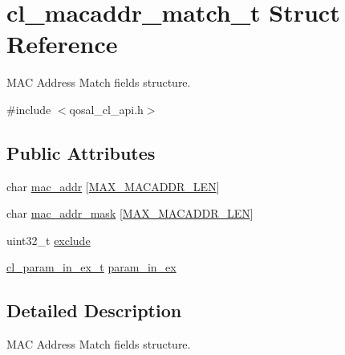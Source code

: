 \hypertarget{structcl__macaddr__match__t}{\section{cl\-\_\-macaddr\-\_\-match\-\_\-t Struct Reference}
\label{structcl__macaddr__match__t}
}


M\-A\-C Address Match fields structure.  




{\ttfamily \#include $<$qosal\-\_\-cl\-\_\-api.\-h$>$}

\subsection*{Public Attributes}
\begin{DoxyCompactItemize}
\item 
char \hyperlink{structcl__macaddr__match__t_a9ba77bbd538c732284e04b1ea1dc0a47}{mac\-\_\-addr} \mbox{[}\hyperlink{group__FAPI__QOS__CLASS_gaaee7f1d8ba9da4f019bf0068103e6672}{M\-A\-X\-\_\-\-M\-A\-C\-A\-D\-D\-R\-\_\-\-L\-E\-N}\mbox{]}
\item 
char \hyperlink{structcl__macaddr__match__t_aa661f14e7e8588a53e6b25f5e64f24d6}{mac\-\_\-addr\-\_\-mask} \mbox{[}\hyperlink{group__FAPI__QOS__CLASS_gaaee7f1d8ba9da4f019bf0068103e6672}{M\-A\-X\-\_\-\-M\-A\-C\-A\-D\-D\-R\-\_\-\-L\-E\-N}\mbox{]}
\item 
uint32\-\_\-t \hyperlink{structcl__macaddr__match__t_abfcdb9a9949a2ba700c4eb5e2d334e30}{exclude}
\item 
\hyperlink{structcl__param__in__ex__t}{cl\-\_\-param\-\_\-in\-\_\-ex\-\_\-t} \hyperlink{structcl__macaddr__match__t_a8defd30e648caeb188f39a722ae47cdd}{param\-\_\-in\-\_\-ex}
\end{DoxyCompactItemize}


\subsection{Detailed Description}
M\-A\-C Address Match fields structure. 

